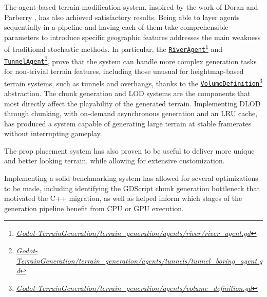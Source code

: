 The agent-based terrain modification system, inspired by the work of Doran and Parberry \cite{Doran:2010:CPT}, has also achieved satisfactory results.
Being able to layer agents sequentially in a pipeline and having each of them take comprehensible parameters to introduce specific geographic features addresses the main weakness of traditional stochastic methods.
In particular, the \href{{https://github.com/fsande/TFG---Eric-Rios/blob/main/Godot-TerrainGeneration/terrain_generation/agents/river/river_agent.gd}}{\texttt{RiverAgent}}\footnote{\href{{https://github.com/fsande/TFG---Eric-Rios/blob/main/Godot-TerrainGeneration/terrain_generation/agents/river/river_agent.gd}}{\textit{Godot-TerrainGeneration/terrain\_generation/agents/river/river\_agent.gd}}} and \href{{https://github.com/fsande/TFG---Eric-Rios/tree/main/Godot-TerrainGeneration/terrain_generation/agents/tunnels}}{\texttt{TunnelAgent}}\footnote{\href{{https://github.com/fsande/TFG---Eric-Rios/tree/main/Godot-TerrainGeneration/terrain_generation/agents/tunnels}}{\textit{Godot-TerrainGeneration/terrain\_generation/agents/tunnels/tunnel\_boring\_agent.gd}}}, prove that the system can handle more complex generation tasks for non-trivial terrain features, including those unusual for heightmap-based terrain systems, such as tunnels and overhangs, thanks to the  \href{{https://github.com/fsande/TFG---Eric-Rios/blob/main/Godot-TerrainGeneration/terrain_generation/agents/volume_definition.gd}}{\texttt{VolumeDefinition}}\footnote{\href{{https://github.com/fsande/TFG---Eric-Rios/blob/main/Godot-TerrainGeneration/terrain_generation/agents/volume_definition.gd}}{\textit{Godot-TerrainGeneration/terrain\_generation/agents/volume\_definition.gd}}} abstraction.
The chunk generation and LOD systems are the components that most directly affect the playability of the generated terrain.
Implementing DLOD through chunking, with on-demand asynchronous generation and an LRU cache, has produced a system capable of generating large terrain at stable framerates without interrupting gameplay.

The prop placement system has also proven to be useful to deliver more unique and better looking terrain, while allowing for extensive customization.

Implementing a solid benchmarking system has allowed for several optimizations to be made, including identifying the GDScript chunk generation bottleneck that motivated the C++ migration, as well as helped inform which stages of the generation pipeline benefit from CPU or GPU execution.

